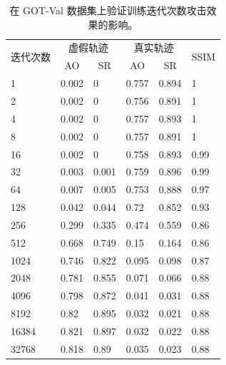 \begin{table}[t!]
\centering
\caption{在 GOT-Val 数据集上验证训练迭代次数攻击效果的影响。}
\begin{tabular}{@{}llllll@{}}
\toprule
\multirow{2}{*}{迭代次数} & \multicolumn{2}{c}{虚假轨迹} & \multicolumn{2}{c}{真实轨迹} & \multirow{2}{*}{SSIM}\\ \cmidrule(lr){2-3} \cmidrule(lr){4-5}
 & \multicolumn{1}{c}{AO} & \multicolumn{1}{c}{SR} & \multicolumn{1}{c}{AO} & \multicolumn{1}{c}{SR} &  \\ \midrule
1 & 0.002 & 0 & 0.757 & 0.894 & 1   \\
2 & 0.002 & 0 & 0.756 & 0.891 & 1   \\
4 & 0.002 & 0 & 0.757 & 0.893 & 1   \\
8 & 0.002 & 0 & 0.757 & 0.891 & 1   \\
16 & 0.002 & 0 & 0.758 & 0.893 & 0.99 \\
32 & 0.003 & 0.001 & 0.759 & 0.896 & 0.99 \\
64 & 0.007 & 0.005 & 0.753 & 0.888 & 0.97 \\
128 & 0.042 & 0.044 & 0.72 & 0.852 & 0.93 \\
256 & 0.299 & 0.335 & 0.474 & 0.559 & 0.86 \\
512 & 0.668 & 0.749 & 0.15 & 0.164 & 0.86 \\
1024 & 0.746 & 0.822 & 0.095 & 0.098 & 0.87 \\
2048 & 0.781 & 0.855 & 0.071 & 0.066 & 0.88 \\
4096 & 0.798 & 0.872 & 0.041 & 0.031 & 0.88 \\
8192 & 0.82 & 0.895 & 0.032 & 0.021 & 0.88 \\
16384 & 0.821 & 0.897 & 0.032 & 0.022 & 0.88 \\
32768 & 0.818 & 0.89 & 0.035 & 0.023 & 0.88 \\ \bottomrule
\end{tabular}
\label{tab:attack_iter}
\end{table}

